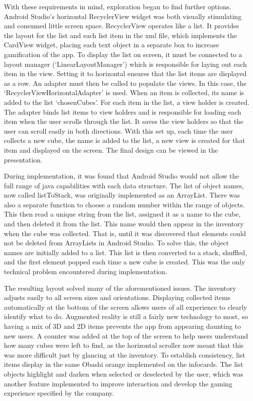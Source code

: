 \documentclass{l3proj}
\begin{document}
With these requirements in mind, exploration began to find further options. Android Studio’s 
horizontal RecyclerView widget was both visually stimulating and consumed little screen space.  
RecyclerView operates like a list. It provides the layout for the list and each list item in 
the xml file, which implements the CardView widget, placing each text object in a separate box 
to increase gamification of the app. To display the list on screen, it must be connected to a 
layout manager (‘LinearLayoutManager’) which is responsible for laying out each item in the view.  
Setting it to horizontal ensures that the list items are displayed as a row.  An adapter must 
then be called to populate the views. In this case, the ‘RecyclerViewHorizontalAdapter’ is used.  
When an item is collected, its name is added to the list ‘chosenCubes’. For each item in the 
list, a view holder is created. The adapter binds list items to view holders and is responsible 
for loading each item when the user scrolls through the list. It saves the view holders so that 
the user can scroll easily in both directions.  With this set up, each time the user collects a 
new cube, the name is added to the list, a new view is created for that item and displayed on 
the screen. The final design can be viewed in the presentation.

During implementation, it was found that Android Studio would not allow the full range of java 
capabilities with each data structure. The list of object names, now called listToStack, was 
originally implemented as an ArrayList. There was also a separate function to choose a random 
number within the range of objects. This then read a unique string from the list, assigned it 
as a name to the cube, and then deleted it from the list. This name would then appear in the 
inventory when the cube was collected. That is, until it was discovered that elements could not 
be deleted from ArrayLists in Android Studio. To solve this, the object names are initially 
added to a list. This list is then converted to a stack, shuffled, and the first element popped 
each time a new cube is created. This was the only technical problem encountered during implementation.

The resulting layout solved many of the aforementioned issues. The inventory adjusts easily to 
all screen sizes and orientations. Displaying collected items automatically at the bottom of 
the screen allows users of all experience to clearly identify what to do. Augmented reality is 
still a fairly new technology to most, so having a mix of 3D and 2D items prevents the app from 
appearing daunting to new users. A counter was added at the top of the screen to help users 
understand how many cubes were left to find, as the horizontal scroller now meant that this was 
more difficult just by glancing at the inventory. To establish consistency, list items display 
in the same Obashi orange implemented on the infocards. The list objects highlight and darken when 
selected or deselected by the user, which was another feature implemented to improve interaction and 
develop the gaming experience specified by the company.  
\end{document}
